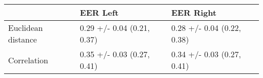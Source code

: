 \begin{tabular}{lll}
\toprule
{} &                    EER Left &                   EER Right \\
\midrule
Euclidean distance &  0.29 +/- 0.04 (0.21, 0.37) &  0.28 +/- 0.04 (0.22, 0.38) \\
Correlation        &  0.35 +/- 0.03 (0.27, 0.41) &  0.34 +/- 0.03 (0.27, 0.41) \\
\bottomrule
\end{tabular}
